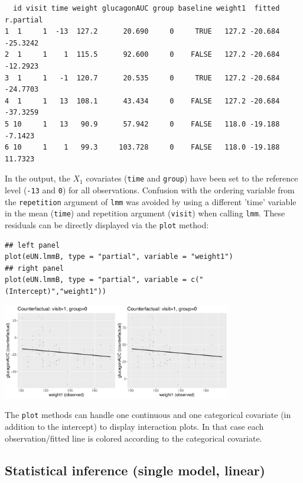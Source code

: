 \documentclass[12pt]{article}
\begin{document}
\begin{verbatim}
  id visit time weight glucagonAUC group baseline weight1  fitted r.partial
1  1     1  -13  127.2      20.690     0     TRUE   127.2 -20.684  -25.3242
2  1     1    1  115.5      92.600     0    FALSE   127.2 -20.684  -12.2923
3  1     1   -1  120.7      20.535     0     TRUE   127.2 -20.684  -24.7703
4  1     1   13  108.1      43.434     0    FALSE   127.2 -20.684  -37.3259
5 10     1   13   90.9      57.942     0    FALSE   118.0 -19.188   -7.1423
6 10     1    1   99.3     103.728     0    FALSE   118.0 -19.188   11.7323
\end{verbatim}


In the output, the \(X_1\) covariates (\texttt{time} and \texttt{group}) have been
set to the reference level (\texttt{-13} and \texttt{0}) for all
observations. Confusion with the ordering variable from the
\texttt{repetition} argument of \texttt{lmm} was avoided by using a different 'time'
variable in the mean (\texttt{time}) and repetition argument (\texttt{visit}) when
calling \texttt{lmm}.  These residuals can be directly displayed via the
\texttt{plot} method:
\lstset{language=r,label= ,caption= ,captionpos=b,numbers=none}
\begin{lstlisting}
## left panel
plot(eUN.lmmB, type = "partial", variable = "weight1")
## right panel
plot(eUN.lmmB, type = "partial", variable = c("(Intercept)","weight1"))
\end{lstlisting}

\begin{center}
\includegraphics[width=0.75\textwidth]{./figures/fit-pres.pdf}
\end{center}

The \texttt{plot} methods can handle one continuous and one categorical
covariate (in addition to the intercept) to display interaction
plots. In that case each observation/fitted line is colored according
to the categorical covariate.

\clearpage

\subsection{Statistical inference (single model, linear)}
\label{sec:orgf86f6a7}
\end{document}
